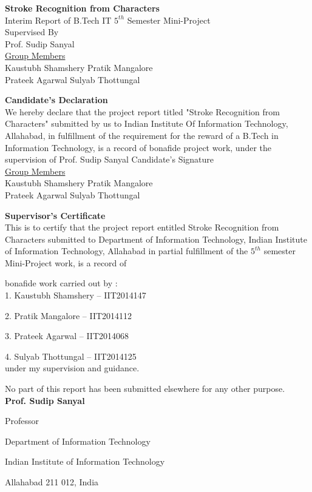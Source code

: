 \documentclass[10pt]{article}
\begin{document}
	\newpage
	\begin{center}
		\Huge \textbf{Stroke Recognition from Characters}
		\\[180pt]
		\Large Interim Report of B.Tech IT $5^{th}$ Semester Mini-Project
		\\[100pt]
		\Large Supervised By\\Prof. Sudip Sanyal
		\\[100pt]
		\underline{Group Members}
		\\[20pt]
		Kaustubh Shamshery \hspace{40pt} Pratik Mangalore\\Prateek Agarwal \hspace{60pt}Sulyab Thottungal     
	\end{center}
	\large
	\newpage
	\begin{center}
		\Huge \textbf{Candidate's Declaration}
		\\[250pt]
		\Large
		We hereby declare that the project report titled "Stroke Recognition from Characters" submitted by us to Indian Institute Of Information Technology, Allahabad, in fulfillment of the requirement for the reward of a B.Tech in Information Technology, is a record of bonafide project work, under the supervision of Prof. Sudip Sanyal Candidate's Signature
		\\[100pt]
		\underline{Group Members}
		\\[20pt]
		Kaustubh Shamshery \hspace{40pt} Pratik Mangalore\\Prateek Agarwal \hspace{60pt}Sulyab Thottungal
	\end{center}
	\newpage
	\begin{center}
		\Huge \textbf{Supervisor's Certificate}
		\\[100pt]
		\Large
		This is to certify that the project report entitled Stroke Recognition from Characters	submitted to Department of Information Technology, Indian Institute of Information	Technology, Allahabad in partial fulfillment of the $5^{th}$ semester Mini-Project work, is a record of
		
		bonafide work carried out by :
		\\[30pt]
		1. Kaustubh Shamshery – IIT2014147
		
		2. Pratik Mangalore – IIT2014112
		
		3. Prateek Agarwal – IIT2014068
		
		4. Sulyab Thottungal – IIT2014125
		\\[30pt]
		under my supervision and guidance.
		
		No part of this report has been submitted elsewhere for any other purpose.
		\\[40pt]
		\flushright
		\textbf{Prof. Sudip Sanyal}
		
		Professor
		
		Department of Information Technology
		
		Indian Institute of Information Technology
		
		Allahabad 211 012, India
	\end{center}
	\newpage
	\tableofcontents
	\newpage
	\large
\end{document}
